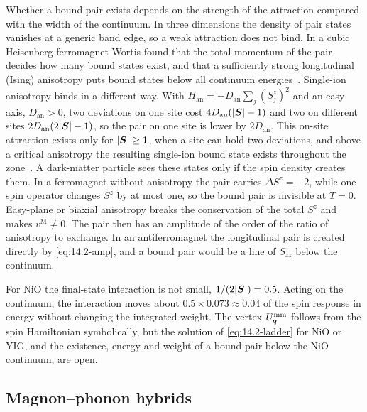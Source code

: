 Whether a bound pair exists depends on the strength of the attraction compared with the width of the continuum. In three dimensions the density of pair states vanishes at a generic band edge, so a weak attraction does not bind. In a cubic Heisenberg ferromagnet Wortis found that the total momentum of the pair decides how many bound states exist, and that a sufficiently strong longitudinal (Ising) anisotropy puts bound states below all continuum energies~\cite{wortis1963bound}. Single-ion anisotropy binds in a different way. With $H_{\mathrm{an}} = -D_{\mathrm{an}}\sum_j(S^z_j)^2$ and an easy axis, $D_{\mathrm{an}} > 0$, two deviations on one site cost $4D_{\mathrm{an}}(|\bm{S}| - 1)$ and two on different sites $2D_{\mathrm{an}}(2|\bm{S}| - 1)$, so the pair on one site is lower by $2D_{\mathrm{an}}$. This on-site attraction exists only for $|\bm{S}| \ge 1$, when a site can hold two deviations, and above a critical anisotropy the resulting single-ion bound state exists throughout the zone~\cite{silberglitt1970effect}. A dark-matter particle sees these states only if the spin density creates them. In a ferromagnet without anisotropy the pair carries $\Delta S^z = -2$, while one spin operator changes $S^z$ by at most one, so the bound pair is invisible at $T = 0$. Easy-plane or biaxial anisotropy breaks the conservation of the total $S^z$ and makes $v^{\mathrm{M}} \neq 0$. The pair then has an amplitude of the order of the ratio of anisotropy to exchange. In an antiferromagnet the longitudinal pair is created directly by \cref{eq:14.2-amp}, and a bound pair would be a line of $S_{zz}$ below the continuum.

For NiO the final-state interaction is not small, $1/(2|\bm{S}|) = 0.5$. Acting on the continuum, the interaction moves about $0.5 \times 0.073 \approx 0.04$ of the spin response in energy without changing the integrated weight. The vertex $U^{\mathrm{mm}}_{\bm{q}}$ follows from the spin Hamiltonian symbolically, but the solution of \cref{eq:14.2-ladder} for NiO or YIG, and the existence, energy and weight of a bound pair below the NiO continuum, are open.

\subsection{Magnon--phonon hybrids}\label{sec:14.2-hybrid}

